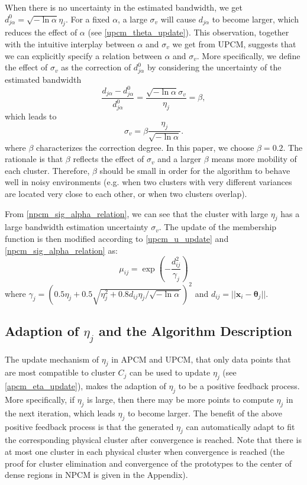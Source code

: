 \documentclass[conference]{IEEEtran}
\theoremstyle{definition}
\begin{document}
When there is no uncertainty in the estimated bandwidth, we get $d_{j\alpha}^0=\sqrt{-\ln\alpha}\eta_j$. For a fixed $\alpha$, a large $\sigma_v$ will cause $d_{j\alpha}$ to become larger, which reduces the effect of $\alpha$ (see \eqref{upcm_theta_update}). This observation, together with the intuitive interplay between $\alpha$ and $\sigma_v$ we get from UPCM, suggests that we can explicitly specify a relation between $\alpha$ and $\sigma_v$. More specifically, we define the effect of $\sigma_v$ as the correction of $d_{j\alpha}^0$ by considering the uncertainty of the estimated bandwidth
\begin{equation}
\frac{d_{j\alpha}-d_{j\alpha}^0}{d_{j\alpha}^0}=\frac{\sqrt{-\ln\alpha}\sigma_v}{\eta_j}=\beta,
\end{equation}
which leads to
\begin{equation}
\label{npcm_sig_alpha_relation}
\sigma_v=\beta\frac{\eta_j}{\sqrt{-\ln\alpha}}.
\end{equation}
where $\beta$ characterizes the correction degree.  In this paper, we choose $\beta=0.2$.
The rationale is that $\beta$ reflects the effect of $\sigma_v$ and a larger $\beta$ means more mobility of each cluster.
Therefore, $\beta$ should be small in order for the algorithm to behave well in noisy environments (e.g. when two clusters with very different variances are located very close to each other, or when two clusters overlap).

From \eqref{npcm_sig_alpha_relation}, we can see that the cluster with large $\eta_j$ has a large bandwidth estimation uncertainty $\sigma_v$. The update of the membership function is then modified according to \eqref{upcm_u_update} and \eqref{npcm_sig_alpha_relation} as:
\begin{equation}
\label{npcm_u_update}
\mu_{ij}=\exp\left(-\frac{d_{ij}^2}{\gamma_j}\right)
\end{equation}
where $\gamma_j=\left(0.5\eta_{j}+0.5\sqrt{\eta_{j}^{2}+0.8d_{ij}\eta_j/\sqrt{-\ln\alpha}}\right)^2$ and $d_{ij}=||\mathbf{x}_i-\boldsymbol{\theta}_j||$.
\subsection{Adaption of $\eta_j$ and the Algorithm Description}
\label{sec-3-4}
The update mechanism of $\eta_j$ in APCM and UPCM, that only data points that are most compatible to cluster $C_j$ can be used to update $\eta_j$ (see \eqref{apcm_eta_update}), makes the adaption of $\eta_j$ to be a positive feedback process. More specifically, if $\eta_j$ is large, then there may be more points to compute $\eta_j$ in the next iteration, which leads $\eta_j$ to become larger.
The benefit of the above positive feedback process is that the generated $\eta_j$ can automatically adapt to fit the corresponding physical cluster after convergence is reached.
Note that there is at most one cluster in each physical cluster when convergence is reached (the proof for cluster elimination and convergence of the prototypes to the center of dense regions in NPCM is given in the Appendix).
\end{document}
